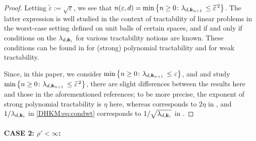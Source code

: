 \documentclass[USenglish]{article}
\theoremstyle{dgthm}
\theoremstyle{dgthm}
\theoremstyle{dgthm}
\theoremstyle{dgthm}
\theoremstyle{dgdef}
\begin{document}
\begin{proof}
Letting $\widetilde{\varepsilon}:=\sqrt{\varepsilon}$, we see that 
$n(\varepsilon,d)=\min \left \{n\geq 0\colon \lambda_{d,{\boldsymbol{k}}_{n+1}} \,\leq \widetilde{\varepsilon}^{\,2} \right \}$. The latter expression is well studied in the context of tractability of linear problems in the worst-case setting defined on unit balls of certain spaces, and if and only if conditions on the $\lambda_{d,{\boldsymbol{k}}_i}$ for various tractability notions are known. These conditions can be found in \cite[Chapter 5]{NovWoz08a} for (strong) polynomial tractability and  \cite{WerWoz17} for weak tractability.

Since, in this paper, we consider $\min \left \{n\geq 0\colon \lambda_{d,{\boldsymbol{k}}_{n+1}} \,\leq \varepsilon \right \}$, and \cite{NovWoz08a} and
\cite{WerWoz17} study $\min \left \{n\geq 0\colon \lambda_{d,{\boldsymbol{k}}_{n+1}} \,\leq \widetilde{\varepsilon}^{\,2} \right \}$, 
there are slight differences between the results here and those in the aforementioned references; to be more precise, the exponent of strong polynomial tractability is $\eta$ here, whereas corresponds to $2\eta$ in \cite{NovWoz08a}, and $1/\lambda_{d,{\boldsymbol{k}}_i}$ in \eqref{DHKM:eq:condwt} corresponds to $1/\sqrt{\lambda_{d,{\boldsymbol{k}}_i}}$ in \cite{WerWoz17}. 
\end{proof}

\paragraph*{CASE 2: $\rho'<\infty$:} 
\end{document}
